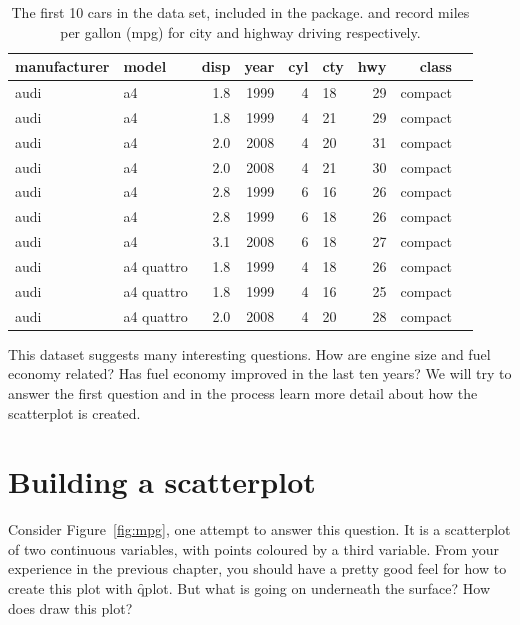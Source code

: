 \begin{table}
  \begin{center}
  \begin{tabular}{llrrrlrrl}
    \toprule
    manufacturer & model & disp & year & cyl & cty & hwy & class \\
    \midrule
    audi & a4         & 1.8 & 1999 & 4 & 18 & 29 & compact\\
    audi & a4         & 1.8 & 1999 & 4 & 21 & 29 & compact\\
    audi & a4         & 2.0 & 2008 & 4 & 20 & 31 & compact\\
    audi & a4         & 2.0 & 2008 & 4 & 21 & 30 & compact\\
    audi & a4         & 2.8 & 1999 & 6 & 16 & 26 & compact\\
    audi & a4         & 2.8 & 1999 & 6 & 18 & 26 & compact\\
    audi & a4         & 3.1 & 2008 & 6 & 18 & 27 & compact\\
    audi & a4 quattro & 1.8 & 1999 & 4 & 18 & 26 & compact\\
    audi & a4 quattro & 1.8 & 1999 & 4 & 16 & 25 & compact\\
    audi & a4 quattro & 2.0 & 2008 & 4 & 20 & 28 & compact\\
        \bottomrule
  \end{tabular}
  \end{center}
  \caption{The first 10 cars in the  data set, included in the \ggplot package.   and  record miles per gallon (mpg) for city and highway driving respectively.  }
  \label{tbl:mpg}
\end{table}

This dataset suggests many interesting questions.  How are engine size and fuel economy related?  Has fuel economy improved in the last ten years?  We will try to answer the first question and in the process learn more detail about how the scatterplot is created.

\section{Building a scatterplot}
\label{sec:simple-plot}

Consider Figure~\ref{fig:mpg}, one attempt to answer this question.  It is a scatterplot of two continuous variables, with points coloured by a third variable.  From your experience in the previous chapter, you should have a pretty good feel for how to create this plot with \f{qplot}.  But what is going on underneath the surface?  How does \ggplot draw this plot?

